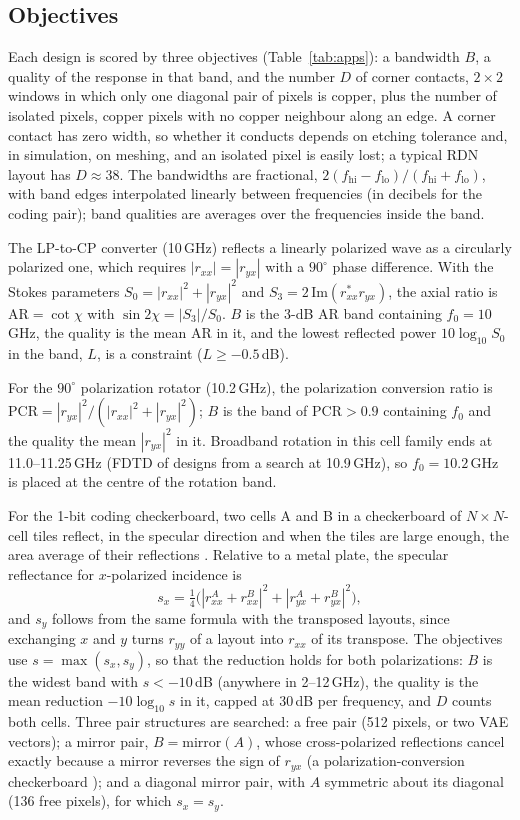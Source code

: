 \documentclass[journal]{IEEEtran}
\begin{document}
\subsection{Objectives}
Each design is scored by three objectives (Table~\ref{tab:apps}): a bandwidth $B$, a quality of the response in that band, and the number $D$ of corner contacts, $2\times2$ windows in which only one diagonal pair of pixels is copper, plus the number of isolated pixels, copper pixels with no copper neighbour along an edge. A corner contact has zero width, so whether it conducts depends on etching tolerance and, in simulation, on meshing, and an isolated pixel is easily lost; a typical RDN layout has $D\approx38$. The bandwidths are fractional, $2(f_{\mathrm{hi}}-f_{\mathrm{lo}})/(f_{\mathrm{hi}}+f_{\mathrm{lo}})$, with band edges interpolated linearly between frequencies (in decibels for the coding pair); band qualities are averages over the frequencies inside the band.

The LP-to-CP converter (10\,GHz) reflects a linearly polarized wave as a circularly polarized one, which requires $|r_{xx}|=|r_{yx}|$ with a $90^\circ$ phase difference. With the Stokes parameters $S_0=|r_{xx}|^2+|r_{yx}|^2$ and $S_3=2\,\mathrm{Im}(r_{xx}^*r_{yx})$, the axial ratio is $\mathrm{AR}=\cot\chi$ with $\sin2\chi=|S_3|/S_0$. $B$ is the 3-dB AR band containing $f_0=10$\,GHz, the quality is the mean AR in it, and the lowest reflected power $10\log_{10}S_0$ in the band, $L$, is a constraint ($L\geq-0.5$\,dB).

For the $90^\circ$ polarization rotator (10.2\,GHz), the polarization conversion ratio is $\mathrm{PCR}=|r_{yx}|^2/(|r_{xx}|^2+|r_{yx}|^2)$; $B$ is the band of $\mathrm{PCR}>0.9$ containing $f_0$ and the quality the mean $|r_{yx}|^2$ in it. Broadband rotation in this cell family ends at 11.0--11.25\,GHz (FDTD of designs from a search at 10.9\,GHz), so $f_0=10.2$\,GHz is placed at the centre of the rotation band.

For the 1-bit coding checkerboard, two cells A and B in a checkerboard of $N\times N$-cell tiles reflect, in the specular direction and when the tiles are large enough, the area average of their reflections \cite{paquay,cui_coding}. Relative to a metal plate, the specular reflectance for $x$-polarized incidence is
\begin{equation}
s_x=\tfrac14\big(|r^{A}_{xx}+r^{B}_{xx}|^2+|r^{A}_{yx}+r^{B}_{yx}|^2\big),
\label{eq:coding}
\end{equation}
and $s_y$ follows from the same formula with the transposed layouts, since exchanging $x$ and $y$ turns $r_{yy}$ of a layout into $r_{xx}$ of its transpose. The objectives use $s=\max(s_x,s_y)$, so that the reduction holds for both polarizations: $B$ is the widest band with $s<-10$\,dB (anywhere in 2--12\,GHz), the quality is the mean reduction $-10\log_{10}s$ in it, capped at 30\,dB per frequency, and $D$ counts both cells. Three pair structures are searched: a free pair (512 pixels, or two VAE vectors); a mirror pair, $B=\mathrm{mirror}(A)$, whose cross-polarized reflections cancel exactly because a mirror reverses the sign of $r_{yx}$ (a polarization-conversion checkerboard \cite{jia_pcm}); and a diagonal mirror pair, with $A$ symmetric about its diagonal (136 free pixels), for which $s_x=s_y$.
\end{document}
